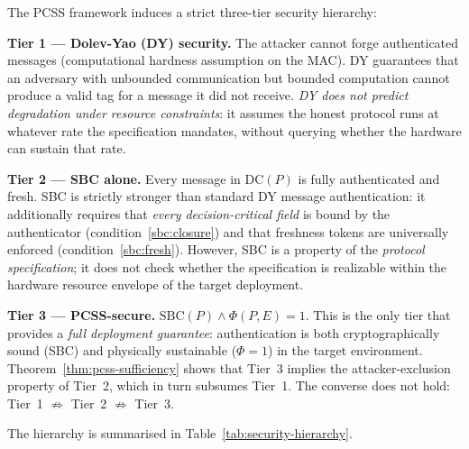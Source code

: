 \begin{remark}
\label{rem:three-tier}
The PCSS framework induces a strict three-tier security hierarchy:

\medskip
\noindent\textbf{Tier 1 — Dolev-Yao (DY) security.}\quad
The attacker cannot forge authenticated messages (computational hardness
assumption on the MAC).  DY guarantees that an adversary with unbounded
communication but bounded computation cannot produce a valid tag for a
message it did not receive.  \emph{DY does not predict degradation under
resource constraints}: it assumes the honest protocol runs at whatever
rate the specification mandates, without querying whether the hardware
can sustain that rate.

\medskip
\noindent\textbf{Tier 2 — SBC alone.}\quad
Every message in $\mathrm{DC}(P)$ is fully authenticated and fresh.  SBC
is strictly stronger than standard DY message authentication: it
additionally requires that \emph{every decision-critical field} is bound
by the authenticator (condition~\ref{sbc:closure}) and that freshness
tokens are universally enforced (condition~\ref{sbc:fresh}).  However,
SBC is a property of the \emph{protocol specification}; it does not check
whether the specification is realizable within the hardware resource
envelope of the target deployment.

\medskip
\noindent\textbf{Tier 3 — PCSS-secure.}\quad
$\mathrm{SBC}(P) \wedge \Phi(P,E)=1$.  This is the only tier that
provides a \emph{full deployment guarantee}: authentication is both
cryptographically sound (SBC) and physically sustainable ($\Phi=1$) in
the target environment.  Theorem~\ref{thm:pcss-sufficiency} shows that
Tier~3 implies the attacker-exclusion property of Tier~2, which in turn
subsumes Tier~1.  The converse does not hold: Tier~1 $\not\Rightarrow$
Tier~2 $\not\Rightarrow$ Tier~3.

\medskip
The hierarchy is summarised in Table~\ref{tab:security-hierarchy}.
\end{remark}

